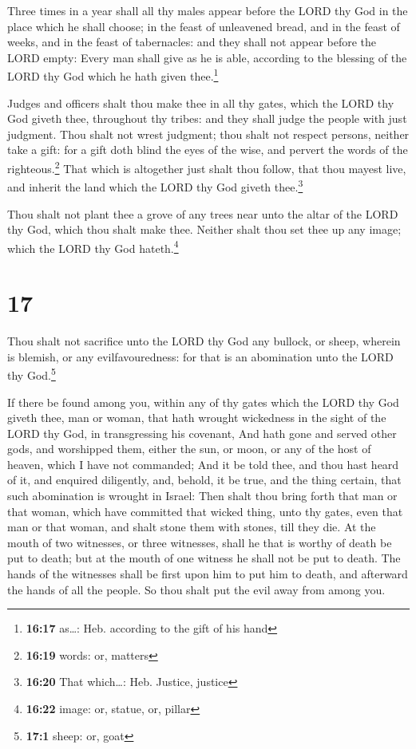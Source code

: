  Three times in a year shall all thy males appear before
the LORD thy God in the place which he shall choose; in the feast of
unleavened bread, and in the feast of weeks, and in the feast of
tabernacles: and they shall not appear before the LORD empty:
 Every man shall give as he is able, according to the
blessing of the LORD thy God which he hath given thee.\footnote{\textbf{16:17}
  as\ldots: Heb. according to the gift of his hand}

 Judges and officers shalt thou make thee in all thy
gates, which the LORD thy God giveth thee, throughout thy tribes: and
they shall judge the people with just judgment.  Thou
shalt not wrest judgment; thou shalt not respect persons, neither take a
gift: for a gift doth blind the eyes of the wise, and pervert the words
of the righteous.\footnote{\textbf{16:19} words: or, matters}
 That which is altogether just shalt thou follow, that
thou mayest live, and inherit the land which the LORD thy God giveth
thee.\footnote{\textbf{16:20} That which\ldots: Heb. Justice, justice}

 Thou shalt not plant thee a grove of any trees near unto
the altar of the LORD thy God, which thou shalt make thee.
 Neither shalt thou set thee up any image; which the LORD
thy God hateth.\footnote{\textbf{16:22} image: or, statue, or, pillar}

\hypertarget{section-16}{%
\section{17}\label{section-16}}

 Thou shalt not sacrifice unto the LORD thy God any
bullock, or sheep, wherein is blemish, or any evilfavouredness: for that
is an abomination unto the LORD thy God.\footnote{\textbf{17:1} sheep:
  or, goat}

 If there be found among you, within any of thy gates
which the LORD thy God giveth thee, man or woman, that hath wrought
wickedness in the sight of the LORD thy God, in transgressing his
covenant,  And hath gone and served other gods, and
worshipped them, either the sun, or moon, or any of the host of heaven,
which I have not commanded;  And it be told thee, and thou
hast heard of it, and enquired diligently, and, behold, it be true, and
the thing certain, that such abomination is wrought in Israel:
 Then shalt thou bring forth that man or that woman, which
have committed that wicked thing, unto thy gates, even that man or that
woman, and shalt stone them with stones, till they die. 
At the mouth of two witnesses, or three witnesses, shall he that is
worthy of death be put to death; but at the mouth of one witness he
shall not be put to death.  The hands of the witnesses
shall be first upon him to put him to death, and afterward the hands of
all the people. So thou shalt put the evil away from among you.

